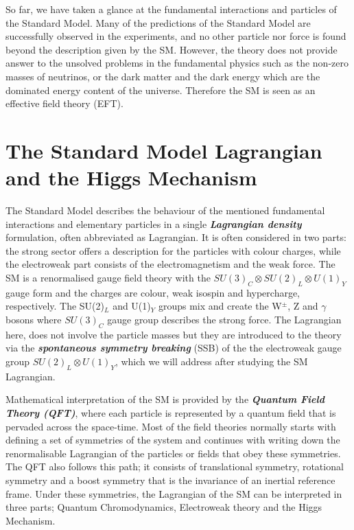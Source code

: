 So far, we have taken a glance at the fundamental interactions and particles of the Standard Model. Many of the predictions of the Standard Model are successfully observed in the experiments, and no other particle nor force is found beyond the description given by the SM. However, the theory does not provide answer to the unsolved problems in the fundamental physics such as the non-zero masses of neutrinos\cite{neutrino-mass}, or the dark matter and the dark energy\cite{PlanckCol} which are the dominated energy content of the universe. Therefore the SM is seen as an effective field theory (EFT)\footnotemark.


\section{The Standard Model Lagrangian and the Higgs Mechanism}

The Standard Model describes the behaviour of the mentioned fundamental interactions and elementary particles in a single \textbf{\textit{Lagrangian density}} formulation, often abbreviated as Lagrangian. It is often considered in two parts: the strong sector offers a description for the particles with colour charges, while the electroweak part consists of the electromagnetism and the weak force. The SM is a renormalised gauge field theory with the $ SU(3)_C \otimes SU(2)_L \otimes U(1)_Y$ gauge form and the charges are colour, weak isospin and hypercharge, respectively. The SU(2)$_L$ and U(1)$_Y$ groups mix and create the W$^{\pm}$, Z and $\gamma$ bosons where $SU(3)_C$ gauge group describes the strong force. The Lagrangian  here, does not involve the particle masses but they are introduced to the theory via the \textbf{\emph{spontaneous symmetry breaking}} (SSB) of the the electroweak gauge group $SU(2)_L \otimes U(1)_Y$, which we will address after studying the SM Lagrangian.

Mathematical interpretation of the SM is provided by the \textbf{\emph{Quantum Field Theory (QFT)}}, where each particle is represented by a quantum field that is pervaded across the space-time. Most of the field theories normally starts with defining a set of symmetries of the system and continues with writing down the renormalisable Lagrangian of the particles or fields that obey these symmetries. The QFT also follows this path; it consists of translational symmetry, rotational symmetry and a boost symmetry that is the invariance of an inertial reference frame. Under these symmetries, the Lagrangian of the SM can be interpreted in three parts; Quantum Chromodynamics, Electroweak theory and the Higgs Mechanism.

